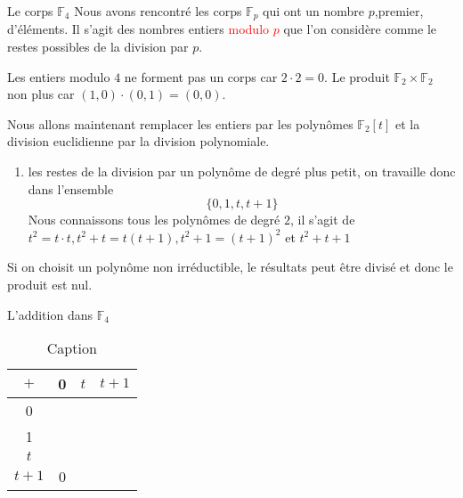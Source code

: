 \begin{parag}{Le corps $\mathbb{F}_4$}
    Nous avons rencontré les corps $ \mathbb{F}_p$ qui ont un nombre $p$,premier, d'éléments. Il s'agit des nombres entiers \textcolor{red}{modulo $p$} que l'on considère comme le restes possibles de la division par $p$.
    \begin{framedremark}
        Les entiers modulo $4$ ne forment pas un corps car $2 \cdot 2 = 0$. Le produit $\mathbb{F}_2 \times \mathbb{F}_2$ non plus car $(1, 0) \cdot (0, 1) = (0, 0)$.
    \end{framedremark}
    Nous allons maintenant remplacer les entiers par les polynômes $\mathbb{F}_2[t]$ et la division euclidienne par la division polynomiale.
    \begin{enumerate}
        \item les restes de la division par un polynôme de degré plus petit, on travaille donc dans l'ensemble
        \[\{0, 1, t, t+1\}\]
        Nous connaissons tous les polynômes de degré $2$, il s'agit de $t^2 = t\cdot t, t^2 + t = t(t+1), t^2+1 = (t+1)^2$ et $t^2 + t + 1$
    \end{enumerate}
    \begin{framedremark}
        Si on choisit un polynôme non irréductible, le résultats peut être divisé et donc le produit est nul.
    \end{framedremark}
    \begin{subparag}{L'addition dans $
    \mathbb{F}_4$}
        
        \begin{table}
            \centering
            \begin{tabular}{cccc}
            \hline
                 $+$&0  & $t$ &$t+1$ \\
                 \hline
                 0&  &  & \\
                 \hline
                 1&  &  & \\
                 \hline
                 $t$&  &  & \\
                 \hline
                 $t+1$ & 0 &
                 \hline
            \end{tabular}
            \caption{Caption}
            \label{tab:my_label}
        \end{table}
    \end{subparag}
\end{parag}
